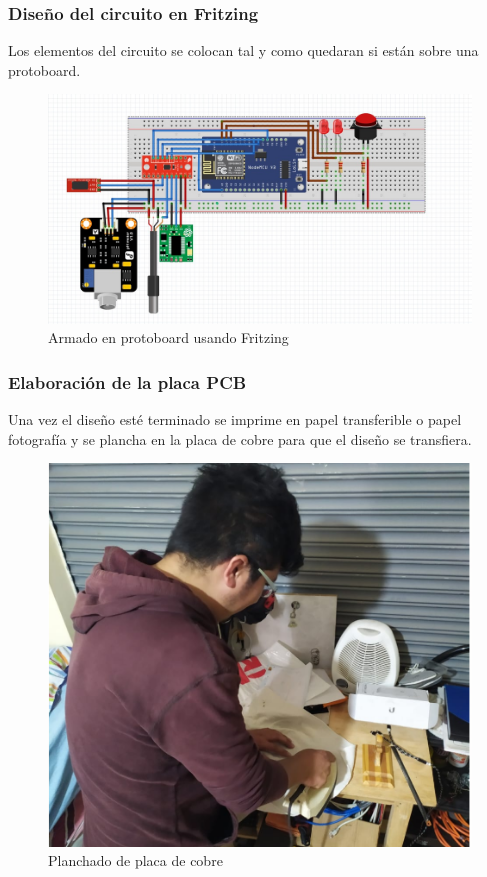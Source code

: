 \documentclass[10pt,a4paper]{article}
\begin{document}
\subsubsection{Diseño del circuito en Fritzing}
Los elementos del circuito se colocan tal y como quedaran si están sobre una protoboard.

\begin{figure}[H]
\centering
\includegraphics[scale=0.40]{fritzing}
\caption{Armado en protoboard usando Fritzing}
\end{figure}
\subsubsection{Elaboración de la placa PCB}
Una vez el diseño esté terminado se imprime en papel transferible o papel fotografía y se plancha en la placa de cobre para que el diseño se transfiera.
\begin{figure}[H]
\centering
\includegraphics[scale=0.6]{planchado}
\caption{Planchado de placa de cobre }
\end{figure}
\end{document}

